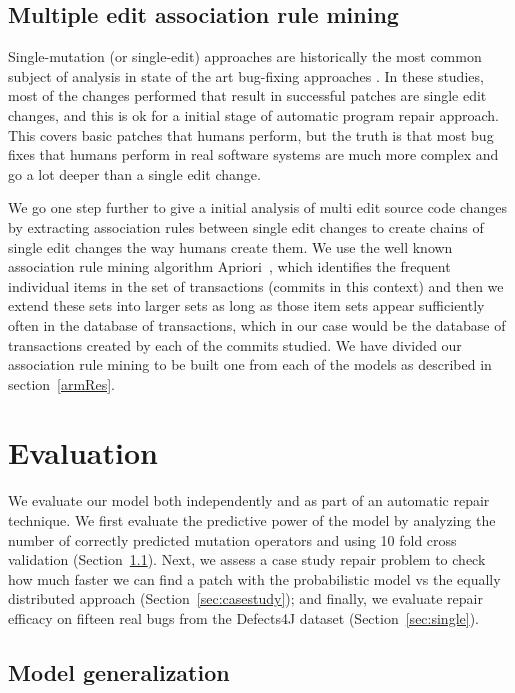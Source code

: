 \documentclass[conference]{IEEEtran}
\begin{document}
\subsection{Multiple edit association rule mining} \label{multEdit}

Single-mutation (or single-edit) approaches are historically the most 
common subject of analysis in 
state of the art bug-fixing approaches
\cite{Qi15,fan15,kim2013,Long2016,legoues12,Qi13,Qi14,xuan16}.
In these studies, most of the changes performed that result in 
successful patches are single edit changes, and this is ok for a initial stage 
of automatic program repair approach. This covers basic patches that humans 
perform, but the truth is that most bug fixes that humans perform in real 
software systems are much more complex and go a lot deeper than a single edit 
change. 

We go one step further to give a initial analysis of multi edit 
source code changes by extracting association rules between single edit changes 
to create chains of single edit changes the way humans create them.
%
We use the 
well known association rule mining algorithm
Apriori~\cite{Agrawal94,Liu98,Zaki2000}, which identifies the frequent 
individual items in the set of transactions (commits in this context) and then we extend these sets into 
larger sets as long as those item sets appear sufficiently often in the database 
of transactions, which in our case would be the database of transactions created 
by each of the commits studied. We have divided our association rule mining to be built one from each of the models as described in section~\ref{armRes}.

\section{Evaluation} \label{evaluation}

We evaluate our model both independently and as part of an automatic repair
technique.  We first evaluate the predictive power of the model by analyzing the number of correctly predicted mutation operators and using 10 fold cross validation (Section~\ref{sec:generalize}).  Next, we assess a case study
repair problem to check how 
much faster we can find a patch with the probabilistic model vs the equally 
distributed approach (Section~\ref{sec:casestudy}); and finally, we evaluate
repair efficacy on fifteen real bugs from the Defects4J dataset
(Section~\ref{sec:single}).

\subsection{Model generalization}
\label{sec:generalize}
\end{document}
